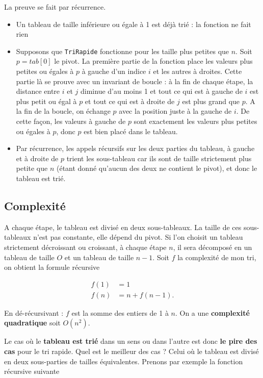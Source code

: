 \documentclass{../cours}
\begin{document}
La preuve se fait par récurrence.
\begin{itemize}
\item Un tableau de taille inférieure ou égale à 1 est déjà trié : la fonction ne fait rien
\item Supposons que {\tt TriRapide} fonctionne pour les taille plus petites que $n$. Soit $p = tab[0]$ le pivot. La première partie de la fonction place les valeurs plus petites ou égales à $p$ à gauche d'un indice $i$ et les autres à droites. Cette partie là se prouve avec un invariant de boucle : à la fin de chaque étape, la distance entre $i$ et $j$ diminue d'au moins 1 et tout ce qui est à gauche de $i$ est plus petit ou égal à $p$ et tout ce qui est à droite de $j$ est plus grand que $p$. A la fin de la boucle, on échange $p$ avec la position juste à la gauche de $i$. De cette façon, les valeurs à gauche de $p$ sont exactement les valeurs plus petites ou égales à $p$, donc $p$ est bien placé dans le tableau. 
\item Par récurrence, les appels récursifs sur les deux parties du tableau, à gauche et à droite de $p$ trient les sous-tableau car ils sont de taille strictement plus petite que $n$ (étant donné qu'aucun des deux ne contient le pivot), et donc le tableau est trié.
\end{itemize}

\subsection{Complexité}

A chaque étape, le tableau est divisé en deux sous-tableaux. La taille de ces sous-tableaux n'est pas constante, elle dépend du pivot. Si l'on choisit un tableau strictement décroissant ou croissant, à chaque étape $n$, il sera décomposé en un tableau de taille $O$ et un tableau de taille $n-1$. Soit $f$ la complexité de mon tri, on obtient la formule récursive

\begin{align}
f(1) &= 1 \\
f(n) &= n + f(n-1).
\end{align}

En dé-récursivant : $f$ est la somme des entiers de 1 à $n$. On a une \textbf{complexité quadratique} soit $O(n^2)$. 

Le cas où le \textbf{tableau est trié} dans un sens ou dans l'autre est donc \textbf{le pire des cas} pour le tri rapide. Quel est le meilleur des cas ? Celui où le tableau est divisé en deux sous-parties de tailles équivalentes. Prenons par exemple la fonction récursive suivante
\end{document}
